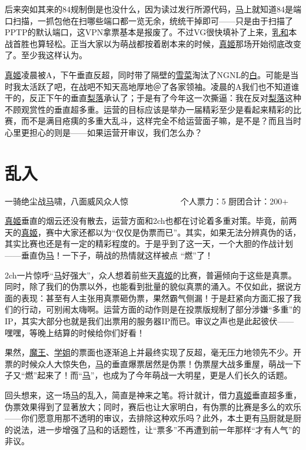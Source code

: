 后来突如其来的84规制倒是也没什么，因为读过发行所源代码，\uline{马}上就知道84是端口扫描，一抓包他在扫哪些端口都一览无余，统统干掉即可——只是由于扫描了PPTP的默认端口，这VPN拿票基本是报废了。不过VG很快填补了上来，\uline{乳和}本战首胜也算轻松。正当大家以为萌战都按着剧本来的时候，\uline{真姬}那场开始彻底改变了。至少我这样认为。

\uline{真姬}凌晨被A，下午垂直反超，同时带了隔壁的\uline{雪菜}淘汰了NGNL的\uline{白}。可能是当时我太活跃了吧，在战吧不知天高地厚地＠了各家领袖。凌晨的A我们也不知道谁干的，反正下午的垂直\uline{梨落}承认了；于是有了今年这一次撕逼：我在反对\uline{梨落}这种不顾观赏性的垂直超多重。运营的目标应该是举办一届精彩至少是看起来精彩的比赛，而不是满目疮痍的多重大乱斗，这样完全不给运营面子嘛，是不是？而且当时心里更担心的则是——如果运营开审议，我们怎么办？

\chapter{乱入}
\begin{center}
{\subTitle 一骑绝尘战\uline{马}啸，八面威风众人惊}
\subMemo
　　　　　　个人票力：5 厨团合计：200+
\end{center}

\uline{真姬}垂直的烟云还没有散去，运营方面和2ch也都在讨论着多重对策。毕竟，前两天的\uline{真姬}，赛中大家还都以为“仅仅是伪票而已”。其实，如果无法分辨真伪的话，其实比赛也还是有一定的精彩程度的。于是乎到了这一天，一个大胆的作战计划——垂直伪\uline{马}！一下子，萌战的热情就这样被点 “燃”了！

2ch一片惊呼“\uline{马}好强大”，众人想着前些天\uline{真姬}的比赛，普遍倾向于这些是真票。同时，除了我们的伪票以外，也能看到批量的貌似真票的涌入。不仅如此，据说方面的表现：甚至有人主张用真票砸伪票，果然霸气侧漏！于是赶紧向方面汇报了我们的行动，可别闹太嗨啊。运营方面的动作则是在投票版规制了部分涉嫌“多重”的IP，其实大部分也就是我们出票用的服务器IP而已。审议之声也是此起彼伏——嘿嘿，等晚上结算的时候给你们好看！

果然，\uline{魔王}、\uline{学姐}的票面也逐渐追上并最终实现了反超，毫无压力地领先不少。开票的时候众人大惊失色，\uline{马}的垂直爆票居然是伪票！伪票屋大战多重屋，萌战一下子又“燃”起来了！而“\uline{马}”，也成为了今年萌战一大明星，更是人们长久的话题。

回头想来，这一场\uline{马}的乱入，简直是神来之笔。将计就计，借力\uline{真姬}垂直超多重，伪票效果得到了显著放大；同时，赛后也让大家明白，有伪票的比赛是多么的欢乐——你们愿意用那不透明的审议，去排除这种欢乐吗？此外，本土更有\uline{马}厨就是厨的说法，进一步增强了\uline{马}和的话题性，让“票多”不再遭到前一年那样“才有人气”的非议。

